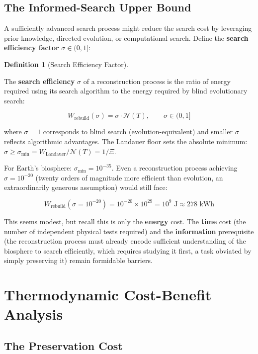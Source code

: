 \documentclass[11pt]{article}
\theoremstyle{plain}
\theoremstyle{definition}
\newtheorem{definition}{Definition}
\theoremstyle{remark}
\let\origsection\section
\renewcommand{\section}{\needspace{12\baselineskip}\origsection}
\let\origsubsection\subsection
\renewcommand{\subsection}{\needspace{7\baselineskip}\origsubsection}
\begin{document}
\subsection{The Informed-Search Upper
Bound}\label{the-informed-search-upper-bound}

A sufficiently advanced search process might reduce the search cost by
leveraging prior knowledge, directed evolution, or computational search.
Define the \textbf{search efficiency factor} \(\sigma \in (0, 1]\):

\begin{definition}[Search Efficiency Factor]
\label{def-search-efficiency-factor}

The \textbf{search efficiency} $\sigma$ of a reconstruction process is the ratio of energy required using its search algorithm to the energy required by blind evolutionary search:

$$W_{\text{rebuild}}(\sigma) = \sigma \cdot \mathcal{N}(T), \qquad \sigma \in (0, 1]$$

where $\sigma = 1$ corresponds to blind search (evolution-equivalent) and smaller $\sigma$ reflects algorithmic advantages. The Landauer floor sets the absolute minimum: $\sigma \geq \sigma_{\min} = W_{\text{Landauer}} / \mathcal{N}(T) = 1/\Xi$.
\end{definition}

For Earth's biosphere: \(\sigma_{\min} = 10^{-35}\). Even a
reconstruction process achieving \(\sigma = 10^{-20}\) (twenty orders of
magnitude more efficient than evolution, an extraordinarily generous
assumption) would still face:

\[W_{\text{rebuild}}(\sigma = 10^{-20}) = 10^{-20} \times 10^{29} = 10^{9} \text{ J} \approx 278 \text{ kWh}\]

This seems modest, but recall this is only the \textbf{energy} cost. The
\textbf{time} cost (the number of independent physical tests required)
and the \textbf{information} prerequisite (the reconstruction process
must already encode sufficient understanding of the biosphere to search
efficiently, which requires studying it first, a task obviated by simply
preserving it) remain formidable barriers.

\section{Thermodynamic Cost-Benefit
Analysis}\label{thermodynamic-cost-benefit-analysis}

\subsection{The Preservation Cost}\label{the-preservation-cost}
\end{document}

